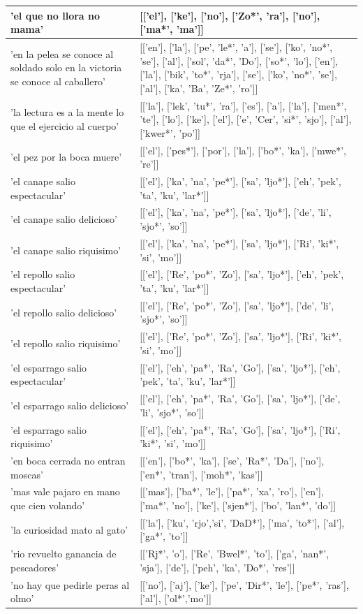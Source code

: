 \documentclass[11pt,a4paper,twoside]{tesis}
\begin{document}
\begin{longtable}{| p{} | p{} |}
'el que no llora no mama' & [['el'], ['ke'], ['no'], ['Zo*', 'ra'], ['no'], ['ma*', 'ma']] \\ \hline
'en la pelea se conoce al soldado solo en la victoria se conoce al caballero' & [['en'], ['la'], ['pe', 'le*', 'a'], ['se'], ['ko', 'no*', 'se'], ['al'], ['sol', 'da*', 'Do'], ['so*', 'lo'], ['en'], ['la'], ['bik', 'to*', 'rja'], ['se'], ['ko', 'no*', 'se'], ['al'], ['ka', 'Ba', 'Ze*', 'ro']] \\ \hline
'la lectura es a la mente lo que el ejercicio al cuerpo' & [['la'], ['lek', 'tu*', 'ra'], ['es'], ['a'], ['la'], ['men*', 'te'], ['lo'], ['ke'], ['el'], ['e', 'Cer', 'si*', 'sjo'], ['al'], ['kwer*', 'po']] \\ \hline
'el pez por la boca muere' & [['el'], ['pes*'], ['por'], ['la'], ['bo*', 'ka'], ['mwe*', 're']] \\ \hline
'el canape salio espectacular' & [['el'], ['ka', 'na', 'pe*'], ['sa', 'ljo*'], ['eh', 'pek', 'ta', 'ku', 'lar*']] \\ \hline
'el canape salio delicioso' & [['el'], ['ka', 'na', 'pe*'], ['sa', 'ljo*'], ['de', 'li', 'sjo*', 'so']] \\ \hline
'el canape salio riquisimo' & [['el'], ['ka', 'na', 'pe*'], ['sa', 'ljo*'], ['Ri', 'ki*', 'si', 'mo']] \\ \hline
'el repollo salio espectacular' & [['el'], ['Re', 'po*', 'Zo'], ['sa', 'ljo*'], ['eh', 'pek', 'ta', 'ku', 'lar*']] \\ \hline
'el repollo salio delicioso' & [['el'], ['Re', 'po*', 'Zo'], ['sa', 'ljo*'], ['de', 'li', 'sjo*', 'so']] \\ \hline
'el repollo salio riquisimo' & [['el'], ['Re', 'po*', 'Zo'], ['sa', 'ljo*'], ['Ri', 'ki*', 'si', 'mo']] \\ \hline
'el esparrago salio espectacular' & [['el'], ['eh', 'pa*', 'Ra', 'Go'], ['sa', 'ljo*'], ['eh', 'pek', 'ta', 'ku', 'lar*']] \\ \hline
'el esparrago salio delicioso' & [['el'], ['eh', 'pa*', 'Ra', 'Go'], ['sa', 'ljo*'], ['de', 'li', 'sjo*', 'so']] \\ \hline
'el esparrago salio riquisimo' & [['el'], ['eh', 'pa*', 'Ra', 'Go'], ['sa', 'ljo*'], ['Ri', 'ki*', 'si', 'mo']] \\ \hline
'en boca cerrada no entran moscas' & [['en'], ['bo*', 'ka'], ['se', 'Ra*', 'Da'], ['no'], ['en*', 'tran'], ['moh*', 'kas']] \\ \hline
'mas vale pajaro en mano que cien volando' & [['mas'], ['ba*', 'le'], ['pa*', 'xa', 'ro'], ['en'], ['ma*', 'no'], ['ke'], ['sjen*'], ['bo', 'lan*', 'do']] \\ \hline
'la curiosidad mato al gato' & [['la'], ['ku', 'rjo','si', 'DaD*'], ['ma', 'to*'], ['al'], ['ga*', 'to']] \\ \hline
'rio revuelto ganancia de pescadores' & [['Rj*', 'o'], ['Re', 'Bwel*', 'to'], ['ga', 'nan*', 'sja'], ['de'], ['peh', 'ka', 'Do*', 'res']] \\ \hline
'no hay que pedirle peras al olmo' & [['no'], ['aj'], ['ke'], ['pe', 'Dir*', 'le'], ['pe*', 'ras'], ['al'], ['ol*','mo']] \\ \hline


\end{longtable}
\end{document}
